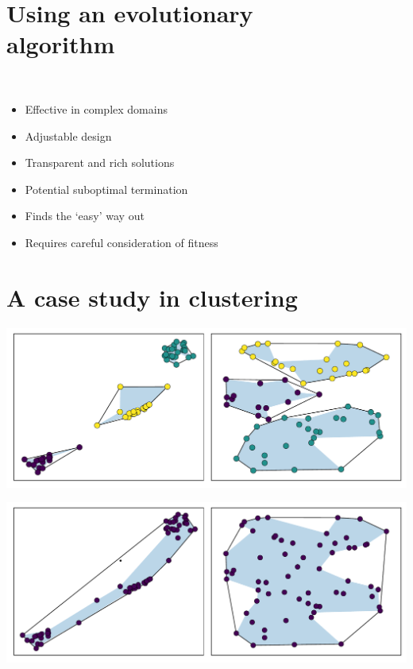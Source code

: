 \documentclass{betterposter}
\begin{document}
{\section{Using an evolutionary\\algorithm}

\begin{minipage}{.05\linewidth}
    \
\end{minipage}
\begin{minipage}{.9\linewidth}
\begin{itemize}
    \renewcommand\labelitemi{\faThumbsOUp~}
    \item Effective in complex domains
    \item Adjustable design
    \item Transparent and rich solutions
\end{itemize}

\vspace{1ex}\begin{itemize}
    \renewcommand\labelitemi{\faThumbsODown~}
    \item Potential suboptimal termination
    \item Finds the `easy' way out
    \item Requires careful consideration of fitness
\end{itemize}
\end{minipage}


\section{A case study in clustering}

\includegraphics[width=\linewidth]{img/kmeans.pdf}\vspace{1ex}

\includegraphics[width=\linewidth]{img/dbscan.pdf}

}
\end{document}
